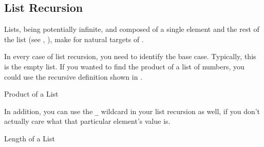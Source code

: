 \subsection{List Recursion}\label{subsec:List_Recursion}
Lists, being potentially infinite, and composed of a single element and the rest of the list (see , ), make for natural targets of .

In every case of list recursion, you need to identify the base case.
Typically, this is the empty list.
If you wanted to find the product of a list of numbers, you could use the recursive definition shown in .
\begin{listing}[h!tbp]
\caption{Product of a List}
\label{lst:List_Recursion-Product}
\end{listing}

In addition, you can use the \texttt{\_} wildcard in your list recursion as well, if you don't actually care what that particular element's value is.
\begin{listing}[h!tbp]
\caption{Length of a List}
\label{lst:List_Recursion-Length}
\end{listing}


